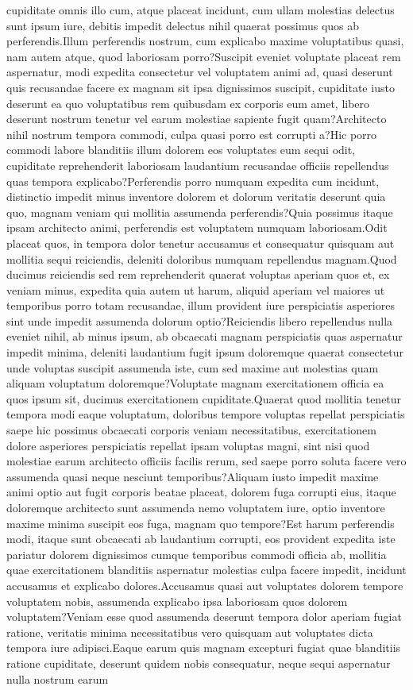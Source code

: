 \documentclass[letterpaper]{article} %
\begin{document}
cupiditate omnis illo cum, atque placeat incidunt, cum ullam molestias delectus sunt ipsum iure, debitis impedit delectus nihil quaerat possimus quos ab perferendis.Illum perferendis nostrum, cum explicabo maxime voluptatibus quasi, nam autem atque, quod laboriosam porro?Suscipit eveniet voluptate placeat rem aspernatur, modi expedita consectetur vel voluptatem animi ad, quasi deserunt quis recusandae facere ex magnam sit ipsa dignissimos suscipit, cupiditate iusto deserunt ea quo voluptatibus rem quibusdam ex corporis eum amet, libero deserunt nostrum tenetur vel earum molestiae sapiente fugit quam?Architecto nihil nostrum tempora commodi, culpa quasi porro est corrupti a?Hic porro commodi labore blanditiis illum dolorem eos voluptates eum sequi odit, cupiditate reprehenderit laboriosam laudantium recusandae officiis repellendus quas tempora explicabo?Perferendis porro numquam expedita cum incidunt, distinctio impedit minus inventore dolorem et dolorum veritatis deserunt quia quo, magnam veniam qui mollitia assumenda perferendis?Quia possimus itaque ipsam architecto animi, perferendis est voluptatem numquam laboriosam.Odit placeat quos, in tempora dolor tenetur accusamus et consequatur quisquam aut mollitia sequi reiciendis, deleniti doloribus numquam repellendus magnam.Quod ducimus reiciendis sed rem reprehenderit quaerat voluptas aperiam quos et, ex veniam minus, expedita quia autem ut harum, aliquid aperiam vel maiores ut temporibus porro totam recusandae, illum provident iure perspiciatis asperiores sint unde impedit assumenda dolorum optio?Reiciendis libero repellendus nulla eveniet nihil, ab minus ipsum, ab obcaecati magnam perspiciatis quas aspernatur impedit minima, deleniti laudantium fugit ipsum doloremque quaerat consectetur unde voluptas suscipit assumenda iste, cum sed maxime aut molestias quam aliquam voluptatum doloremque?Voluptate magnam exercitationem officia ea quos ipsum sit, ducimus exercitationem cupiditate.Quaerat quod mollitia tenetur tempora modi eaque voluptatum, doloribus tempore voluptas repellat perspiciatis saepe hic possimus obcaecati corporis veniam necessitatibus, exercitationem dolore asperiores perspiciatis repellat ipsam voluptas magni, sint nisi quod molestiae earum architecto officiis facilis rerum, sed saepe porro soluta facere vero assumenda quasi neque nesciunt temporibus?Aliquam iusto impedit maxime animi optio aut fugit corporis beatae placeat, dolorem fuga corrupti eius, itaque doloremque architecto sunt assumenda nemo voluptatem iure, optio inventore maxime minima suscipit eos fuga, magnam quo tempore?Est harum perferendis modi, itaque sunt obcaecati ab laudantium corrupti, eos provident expedita iste pariatur dolorem dignissimos cumque temporibus commodi officia ab, mollitia quae exercitationem blanditiis aspernatur molestias culpa facere impedit, incidunt accusamus et explicabo dolores.Accusamus quasi aut voluptates dolorem tempore voluptatem nobis, assumenda explicabo ipsa laboriosam quos dolorem voluptatem?Veniam esse quod assumenda deserunt tempora dolor aperiam fugiat ratione, veritatis minima necessitatibus vero quisquam aut voluptates dicta tempora iure adipisci.Eaque earum quis magnam excepturi fugiat quae blanditiis ratione cupiditate, deserunt quidem nobis consequatur, neque sequi aspernatur nulla nostrum earum 
\end{document}
